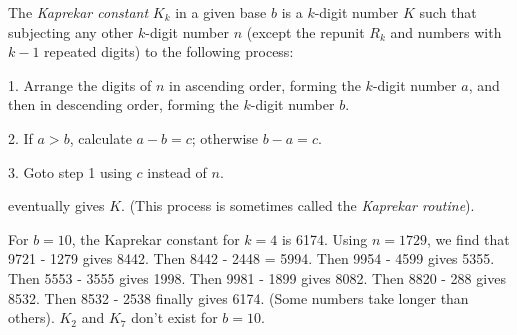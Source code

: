 \documentclass[12pt]{article}
\begin{document}
The {\em Kaprekar constant} $K_k$ in a given base $b$ is a $k$-digit number $K$ such that subjecting any other $k$-digit number $n$ (except the repunit $R_k$ and numbers with $k - 1$ repeated digits) to the following process:

1. Arrange the digits of $n$ in ascending order, forming the $k$-digit number $a$, and then in descending order, forming the $k$-digit number $b$.

2. If $a > b$, calculate $a - b = c$; otherwise $b - a = c$.

3. Goto step 1 using $c$ instead of $n$.

eventually gives $K$. (This process is sometimes called the {\em Kaprekar routine}).

For $b = 10$, the Kaprekar constant for $k = 4$ is 6174. Using $n = 1729$, we find that 9721 - 1279 gives 8442. Then 8442 - 2448 = 5994. Then 9954 - 4599 gives 5355. Then 5553 - 3555 gives 1998. Then 9981 - 1899 gives 8082. Then 8820 - 288 gives 8532. Then 8532 - 2538 finally gives 6174. (Some numbers take longer than others). $K_2$ and $K_7$ don't exist for $b = 10$.
\end{document}
